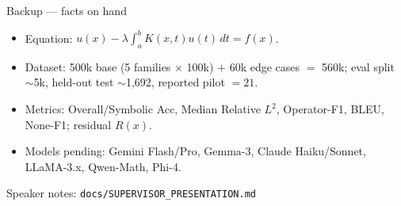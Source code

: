 \documentclass[10pt,aspectratio=169]{beamer}
\begin{document}
\begin{frame}{Backup --- facts on hand}
  \footnotesize
  \begin{itemize}
    \item Equation: $u(x) - \lambda\int_a^b K(x,t)u(t)\,dt = f(x)$.
    \item Dataset: 500k base (5 families $\times$ 100k) $+$ 60k edge cases $=$ 560k;
          eval split $\sim$5k, held-out test $\sim$1{,}692, reported pilot $=21$.
    \item Metrics: Overall/Symbolic Acc, Median Relative $L^2$, Operator-F1, BLEU, None-F1; residual $R(x)$.
    \item Models pending: Gemini Flash/Pro, Gemma-3, Claude Haiku/Sonnet, LLaMA-3.x, Qwen-Math, Phi-4.
  \end{itemize}
  \vfill
  \begin{center}\small Speaker notes: \texttt{docs/SUPERVISOR\_PRESENTATION.md}\end{center}
\end{frame}
\end{document}
